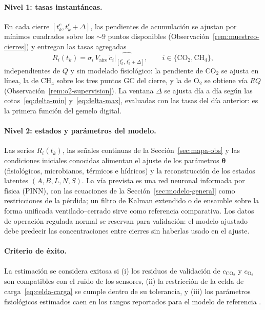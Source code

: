 \paragraph{Nivel 1: tasas instantáneas.} En cada cierre
$[t_k^c, t_k^c + \Delta]$, las pendientes de acumulación se ajustan por
mínimos cuadrados sobre los $\sim 9$ puntos disponibles
(Observación~\ref{rem:muestreo-cierres}) y entregan las tasas agregadas
\[
  R_i(t_k) = \sigma_i\, V_{\mathrm{aire}}\,
  \widehat{\left.\dot c_i\right|_{[t_k^c,\, t_k^c + \Delta]}},
  \qquad i \in \{\mathrm{CO_2}, \mathrm{CH_4}\},
\]
independientes de $Q$ y sin modelado fisiológico: la pendiente de
CO$_2$ se ajusta en línea, la de CH$_4$ sobre los tres puntos GC del
cierre, y la de O$_2$ se obtiene vía $RQ$ (Observación~\ref{rem:o2-supervision}). La ventana $\Delta$ se
ajusta día a día según las cotas~\eqref{eq:delta-min}
y~\eqref{eq:delta-max}, evaluadas con las tasas del día anterior: es la
primera función del gemelo digital.

\paragraph{Nivel 2: estados y parámetros del modelo.} Las series
$R_i(t_k)$, las señales continuas de la Sección~\ref{sec:mapa-obs} y las
condiciones iniciales conocidas alimentan el ajuste de los parámetros
$\boldsymbol{\theta}$ (fisiológicos, microbianos, térmicos e hídricos)
y la reconstrucción de los estados latentes $(A, B, L, N, S)$. La
vía prevista es una red neuronal informada por física (PINN), con las
ecuaciones de la Sección~\ref{sec:modelo-general} como restricciones de
la pérdida; un filtro de Kalman extendido o de ensamble sobre la forma
unificada ventilado--cerrado sirve como referencia comparativa. Los
datos de operación regulada normal se reservan para validación: el
modelo ajustado debe predecir las concentraciones entre cierres sin
haberlas usado en el ajuste.

\paragraph{Criterio de éxito.} La estimación se considera exitosa si
(i) los residuos de validación de $c_{\mathrm{CO_2}}$ y
$c_{\mathrm{O_2}}$ son compatibles con el ruido de los sensores,
(ii) la restricción de la celda de carga~\eqref{eq:celda-carga} se
cumple dentro de su tolerancia, y (iii) los parámetros fisiológicos
estimados caen en los rangos reportados para el modelo de referencia
\citep{eriksenDynamicModellingFeed2022,eriksenMetabolicPerformanceFeed2024}.

